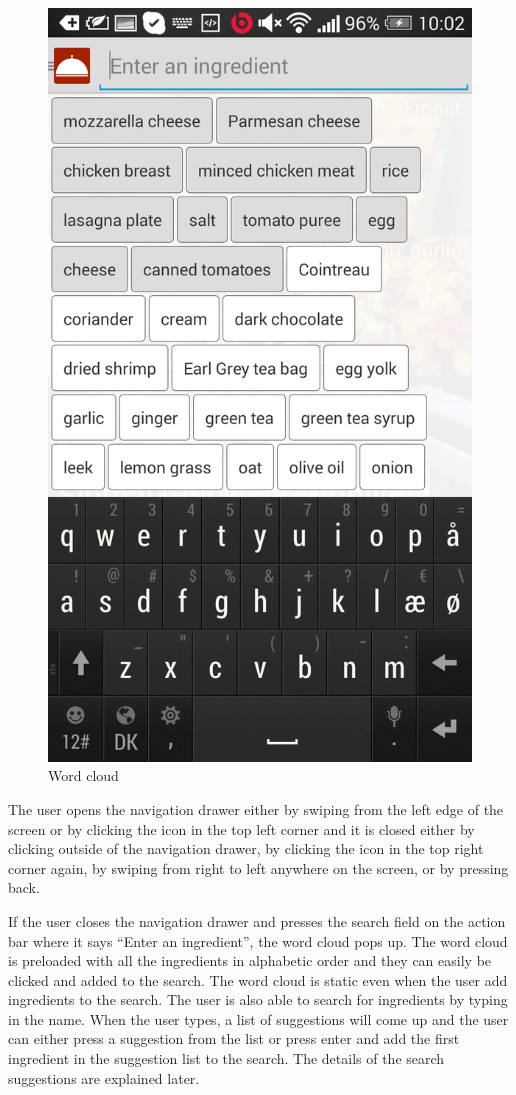 \begin{figure}[H]
\begin{minipage}[t]{0.5\columnwidth}
\includegraphics[width=0.7\columnwidth]{img/screenshots/finalwordcloud.png}
\caption{Word cloud\label{fig:wordcloud}}
\end{minipage}
\end{figure}

The user opens the navigation drawer either by swiping from the left edge of the screen or by clicking the icon in the top left corner and it is closed either by clicking outside of the navigation drawer, by clicking the icon in the top right corner again, by swiping from right to left anywhere on the screen, or by pressing back.

If the user closes the navigation drawer and presses the search field on the action bar where it says ``Enter an ingredient'', the word cloud pops up. The word cloud is preloaded with all the ingredients in alphabetic order and they can easily be clicked and added to the search. 
The word cloud is static even when the user add ingredients to the search. 
The user is also able to search for ingredients by typing in the name. 
When the user types, a list of suggestions will come up and the user can either press a suggestion from the list or press enter and add the first ingredient in the suggestion list to the search. 
The details of the search suggestions are explained later.


